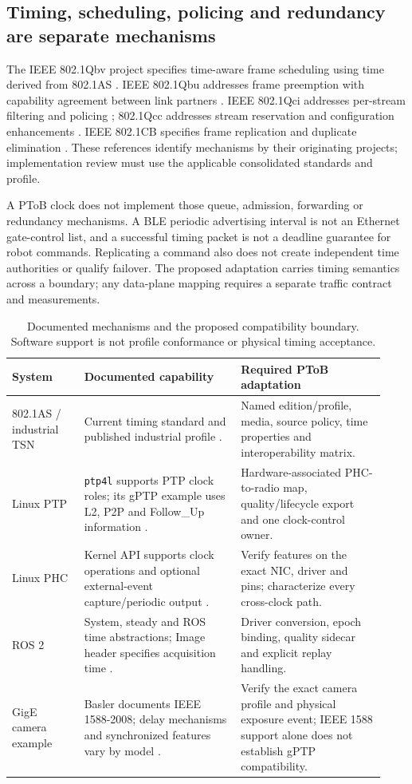 \documentclass[11pt,letterpaper]{article}
\newcommand{\code}[1]{\texttt{#1}}
\begin{document}
\subsection{Timing, scheduling, policing and redundancy are separate mechanisms}
The IEEE 802.1Qbv project specifies time-aware frame scheduling using time derived from 802.1AS \cite{qbv}. IEEE 802.1Qbu addresses frame preemption with capability agreement between link partners \cite{qbu}. IEEE 802.1Qci addresses per-stream filtering and policing \cite{qci}; 802.1Qcc addresses stream reservation and configuration enhancements \cite{qcc}. IEEE 802.1CB specifies frame replication and duplicate elimination \cite{cb}. These references identify mechanisms by their originating projects; implementation review must use the applicable consolidated standards and profile.

A PToB clock does not implement those queue, admission, forwarding or redundancy mechanisms. A BLE periodic advertising interval is not an Ethernet gate-control list, and a successful timing packet is not a deadline guarantee for robot commands. Replicating a command also does not create independent time authorities or qualify failover. The proposed adaptation carries timing semantics across a boundary; any data-plane mapping requires a separate traffic contract and measurements.

\begin{table}[htbp]\centering\small
\caption{Documented mechanisms and the proposed compatibility boundary. Software support is not profile conformance or physical timing acceptance.}\label{tab:compatibility}
\begin{tabular}{@{}L{0.18\linewidth}L{0.39\linewidth}L{0.36\linewidth}@{}}\toprule
System & Documented capability & Required PToB adaptation\\\midrule
802.1AS / industrial TSN & Current timing standard and published industrial profile \cite{as2025,industrial}. & Named edition/profile, media, source policy, time properties and interoperability matrix.\\\addlinespace
Linux PTP & \code{ptp4l} supports PTP clock roles; its gPTP example uses L2, P2P and Follow\_Up information \cite{ptp4l,gptpconfig}. & Hardware-associated PHC-to-radio map, quality/lifecycle export and one clock-control owner.\\\addlinespace
Linux PHC & Kernel API supports clock operations and optional external-event capture/periodic output \cite{phc}. & Verify features on the exact NIC, driver and pins; characterize every cross-clock path.\\\addlinespace
ROS 2 & System, steady and ROS time abstractions; Image header specifies acquisition time \cite{rosclock,rosimage}. & Driver conversion, epoch binding, quality sidecar and explicit replay handling.\\\addlinespace
GigE camera example & Basler documents IEEE 1588-2008; delay mechanisms and synchronized features vary by model \cite{basler}. & Verify the exact camera profile and physical exposure event; IEEE 1588 support alone does not establish gPTP compatibility.\\\bottomrule
\end{tabular}
\end{table}
\end{document}
